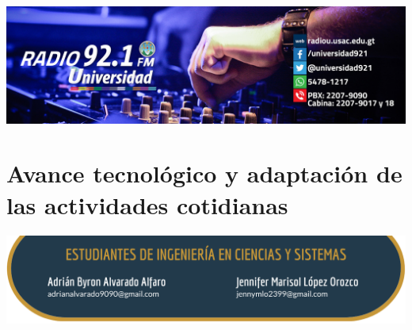 \documentclass[12pt,spanish,Letterpaper,openany]{book}
\begin{document}
\begin{center}\includegraphics[width=1\linewidth]{images/publicidad9} \end{center}

\hypertarget{pareja25}{%
\chapter{Avance tecnológico y adaptación de las actividades cotidianas}\label{pareja25}}

\begin{center}\includegraphics[width=1\linewidth]{images/pareja25_image1} \end{center}
\end{document}
